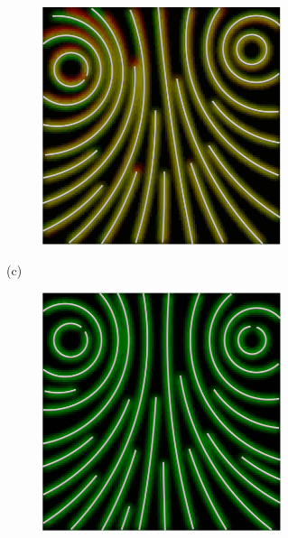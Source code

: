 \begin{figure}[ht]
\begin{subfigure}{\textwidth}
\begin{subfigure}{.19\textwidth}
        \end{subfigure}
        \begin{subfigure}{.19\textwidth}
            \centering
            \includegraphics[scale=.055]{figures/AlphaStudy/Gyro23C.0004.png}
        \end{subfigure}
        \caption*{(c)}
    \end{subfigure}
    \begin{subfigure}{\textwidth}
        \begin{subfigure}{.19\textwidth}
            \centering
            \includegraphics[scale=.055]{figures/AlphaStudy/Gyro33C.0000.png}

\end{subfigure}
\end{subfigure}
\end{figure}
